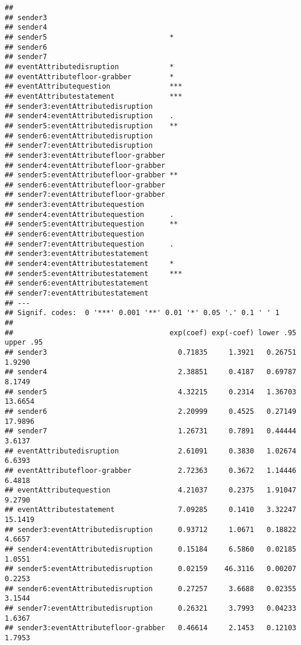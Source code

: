 \documentclass[
]{article}
\begin{document}
\begin{verbatim}
##                                        
## sender3                                
## sender4                                
## sender5                             *  
## sender6                                
## sender7                                
## eventAttributedisruption            *  
## eventAttributefloor-grabber         *  
## eventAttributequestion              ***
## eventAttributestatement             ***
## sender3:eventAttributedisruption       
## sender4:eventAttributedisruption    .  
## sender5:eventAttributedisruption    ** 
## sender6:eventAttributedisruption       
## sender7:eventAttributedisruption       
## sender3:eventAttributefloor-grabber    
## sender4:eventAttributefloor-grabber    
## sender5:eventAttributefloor-grabber ** 
## sender6:eventAttributefloor-grabber    
## sender7:eventAttributefloor-grabber    
## sender3:eventAttributequestion         
## sender4:eventAttributequestion      .  
## sender5:eventAttributequestion      ** 
## sender6:eventAttributequestion         
## sender7:eventAttributequestion      .  
## sender3:eventAttributestatement        
## sender4:eventAttributestatement     *  
## sender5:eventAttributestatement     ***
## sender6:eventAttributestatement        
## sender7:eventAttributestatement        
## ---
## Signif. codes:  0 '***' 0.001 '**' 0.01 '*' 0.05 '.' 0.1 ' ' 1
## 
##                                     exp(coef) exp(-coef) lower .95 upper .95
## sender3                               0.71835     1.3921   0.26751    1.9290
## sender4                               2.38851     0.4187   0.69787    8.1749
## sender5                               4.32215     0.2314   1.36703   13.6654
## sender6                               2.20999     0.4525   0.27149   17.9896
## sender7                               1.26731     0.7891   0.44444    3.6137
## eventAttributedisruption              2.61091     0.3830   1.02674    6.6393
## eventAttributefloor-grabber           2.72363     0.3672   1.14446    6.4818
## eventAttributequestion                4.21037     0.2375   1.91047    9.2790
## eventAttributestatement               7.09285     0.1410   3.32247   15.1419
## sender3:eventAttributedisruption      0.93712     1.0671   0.18822    4.6657
## sender4:eventAttributedisruption      0.15184     6.5860   0.02185    1.0551
## sender5:eventAttributedisruption      0.02159    46.3116   0.00207    0.2253
## sender6:eventAttributedisruption      0.27257     3.6688   0.02355    3.1544
## sender7:eventAttributedisruption      0.26321     3.7993   0.04233    1.6367
## sender3:eventAttributefloor-grabber   0.46614     2.1453   0.12103    1.7953

\end{verbatim}
\end{document}
